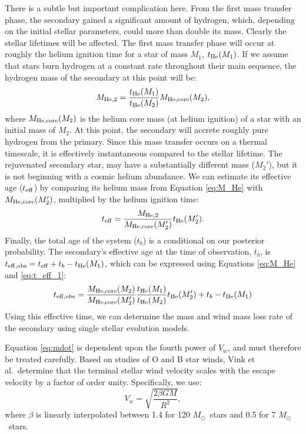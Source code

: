 \documentclass[12pt, preprint]{aastex}
\newcommand{\Msun}{\ifmmode {M_{\odot}}\else${M_{\odot}}$\fi}
\begin{document}
There is a subtle but important complication here. From the first mass transfer phase, the secondary gained a significant amount of hydrogen, which, depending on the initial stellar parameters, could more than double its mass. Clearly the stellar lifetimes will be affected. The first mass transfer phase will occur at roughly the helium ignition time for a star of mass $M_1$, $t_{\rm He} (M_1)$. If we assume that stars burn hydrogen at a constant rate throughout their main sequence, the hydrogen mass of the secondary at this point will be:
\begin{equation}
M_{\rm He,2} = \frac{t_{\rm He}(M_1)}{t_{\rm He}(M_2)} M_{\rm He,core}(M_2), \label{eq:M_He}
\end{equation}
where $M_{\rm He,core}(M_2)$ is the helium core mass (at helium ignition) of a star with an initial mass of $M_2$. At this point, the secondary will accrete roughly pure hydrogen from the primary. Since this mass transfer occurs on a thermal timescale, it is effectively instantaneous compared to the stellar lifetime. The rejuvenated secondary star, may have a substantially different mass ($M_2'$), but it is not beginning with a cosmic helium abundance. We can estimate its effective age ($t_{\rm eff}$) by comparing its helium mass from Equation \ref{eq:M_He} with $M_{\rm He,core}(M_2')$, multiplied by the helium ignition time:
\begin{equation}
t_{\rm eff} = \frac{M_{\rm He,2}}{M_{\rm He,core} (M_2') } t_{\rm He} (M_2'). \label{eq:t_eff_1}
\end{equation}
Finally, the total age of the system ($t_b$) is a conditional on our posterior probability. The secondary's effective age at the time of observation, $t_b$, is $t_{\rm eff,obs} = t_{\rm eff} + t_b - t_{\rm He}(M_1)$, which can be expressed using Equations \ref{eq:M_He} and \ref{eq:t_eff_1}:
\begin{equation}
t_{\rm eff,obs} = \frac{M_{\rm He,core}(M_2)}{M_{\rm He,core}(M_2')} \frac{t_{\rm He}(M_1)}{t_{\rm He}(M_2)} t_{\rm He}(M_2')
  + t_b - t_{\rm He}(M_1) \label{eq:t_eff_obs_full}
\end{equation}
Using this effective time, we can determine the mass and wind mass loss rate of the secondary using single stellar evolution models.

Equation \ref{eq:mdot} is dependent upon the fourth power of $V_w$, and must therefore be treated carefully. Based on studies of O and B star winds, Vink et al.\ determine that the terminal stellar wind velocity scales with the escape velocity by a factor of order unity. Specifically, we use:
\begin{equation}
V_w = \sqrt{\frac{2 \beta G M}{R^2}},
\end{equation}
where $\beta$ is linearly interpolated between 1.4 for 120 \Msun\ stars and 0.5 for 7 \Msun\ stars.
\end{document}
